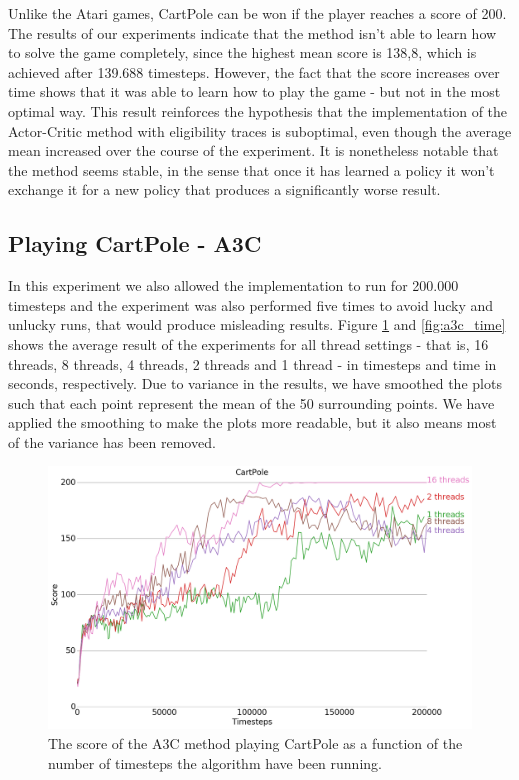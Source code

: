 \documentclass[11pt]{article}
\begin{document}
Unlike the Atari games, CartPole can be won if the player reaches a score of 200.
The results of our experiments indicate that
the method isn't able to learn how to solve the game completely,
since the highest mean score is 138,8, which is achieved after 139.688 timesteps.
However, the fact that the score increases over time
shows that it was able to learn how to play the game -
but not in the most optimal way.
This result reinforces the hypothesis that the implementation of the
Actor-Critic method with eligibility traces is suboptimal, even
though the average mean increased over the course of the experiment.
It is nonetheless notable that the method seems stable, in the sense that once it has learned
a policy it won't exchange it for a new policy that produces a significantly worse result.


\subsection{Playing CartPole - A3C}

In this experiment we also allowed the implementation to run for
200.000 timesteps and
the experiment was also performed five times to avoid lucky and unlucky runs,
that would produce misleading results.
Figure \ref{fig:a3c_time_steps} and \ref{fig:a3c_time} shows the average
result of the experiments for all thread settings - that is, 16 threads, 8 threads, 4 threads,
2 threads and 1 thread - in timesteps and time in seconds, respectively.
Due to variance in the results, 
we have smoothed the plots such that each point represent the mean of the 50
surrounding points.
We have applied the smoothing to make the plots more readable,
but it also means most of the variance has been removed.

\begin{figure}[H]
    \centering
    \includegraphics[scale=0.4]{plots/cartpole_compare_counter_without_AC.png}
    \caption{The score of the A3C method playing CartPole as a function
    of the number of timesteps the algorithm have been running.}
    \label{fig:a3c_time_steps}
\end{figure}
\end{document}
